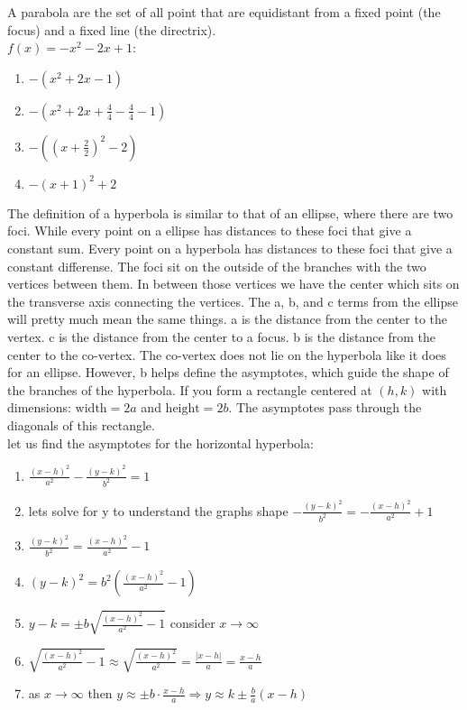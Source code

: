 \documentclass{article}
\begin{document}
A parabola are the set of all point that are equidistant from a fixed point (the focus) and a fixed line (the directrix).\\

$f(x) = -x^2 - 2x + 1$:
	\begin{enumerate}
		\item $-(x^2 + 2x - 1)$
		\item $-(x^2 + 2x + \frac{4}{4} - \frac{4}{4} - 1)$ 
		\item $-((x + \frac{2}{2})^2 - 2)$ 
		\item $-(x + 1)^2 + 2$
	\end{enumerate}

The definition of a hyperbola is similar to that of an ellipse, where there are two foci. While every point on a ellipse has distances to these foci that give a constant sum. Every point on a hyperbola has distances to these foci that give a constant differense. The foci sit on the outside of the branches with the two vertices between them. In between those vertices we have the center which sits on the transverse axis connecting the vertices. The a, b, and c terms from the ellipse will pretty much mean the same things. a is the distance from the center to the vertex. c is the distance from the center to a focus. b is the distance from the center to the co-vertex. The co-vertex does not lie on the hyperbola like it does for an ellipse. However, b helps define the asymptotes, which guide the shape of the branches of the hyperbola. If you form a rectangle centered at $(h, k)$ with dimensions: $\text{width} = 2a$ and $\text{height} = 2b$. The asymptotes pass through the diagonals of this rectangle.\\

let us find the asymptotes for the horizontal hyperbola:
	\begin{enumerate}
		\item $\frac{(x - h)^2}{a^2} - \frac{(y - k)^2}{b^2} = 1$ 
		\item lets solve for y to understand the graphs shape $-\frac{(y - k)^2}{b^2} = -\frac{(x - h)^2}{a^2} + 1$ 
		\item $\frac{(y - k)^2}{b^2} = \frac{(x - h)^2}{a^2} - 1$ 
		\item $(y - k)^2 = b^2(\frac{(x - h)^2}{a^2} - 1)$  
		\item $y - k = \pm b \sqrt{\frac{(x - h)^2}{a^2} - 1}$ consider $x \to \infty$ 
		\item $\sqrt{\frac{(x - h)^2}{a^2} - 1} \approx \sqrt{\frac{(x - h)^2}{a^2}} = \frac{\lvert x - h\rvert}{a} = \frac{x - h}{a}$  
		\item as $x \to \infty$ then $y \approx \pm b \cdot \frac{x - h}{a} \Rightarrow y \approx k \pm \frac{b}{a}(x - h)$
	\end{enumerate}
\end{document}
